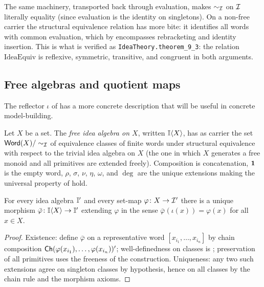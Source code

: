 \begin{remark}
\label{rem:cong-carrier}
The same machinery, transported back through evaluation, makes
$\sim_{\mathcal{I}}$ on $\mathcal{I}$ literally equality (since evaluation is the
identity on singletons). On a non-free carrier the structural
equivalence relation has more bite: it identifies all words with
common evaluation, which by  encompasses
rebracketing and identity insertion. This is what is verified as
\texttt{IdeaTheory.theorem\_9\_3}: the relation $\mathrm{IdeaEquiv}$
is reflexive, symmetric, transitive, and congruent in both arguments.
\end{remark}

\subsection*{Free algebras and quotient maps}

The reflector $\iota$ of  has a more concrete
description that will be useful in concrete model-building.

\begin{construction}\label{cons:free}
Let $X$ be a set. The \emph{free idea algebra on $X$}, written
$\mathbb{I}\langle X\rangle$, has as carrier the set
$\mathsf{Word}(X)/\sim_{\mathcal{I}}$ of equivalence classes of finite words
under structural equivalence with respect to the trivial idea
algebra on $X$ (the one in which $X$ generates a free monoid and all
primitives are extended freely). Composition is concatenation,
$\mathbf{1}$ is the empty word, $\rho$, $\sigma$, $\nu$, $\eta$, $\omega$,
and $\deg$ are the unique extensions making the universal property
of  hold.
\end{construction}

\begin{proposition}
\label{prop:free-ump}
For every idea algebra $\mathbb{I}'$ and every set-map
$\varphi\colon X\to\mathcal{I}'$ there is a unique morphism
$\bar\varphi\colon\mathbb{I}\langle X\rangle\to\mathbb{I}'$ extending
$\varphi$ in the sense $\bar\varphi(\iota(x)) = \varphi(x)$ for all
$x\in X$.
\end{proposition}

\begin{proof}
Existence: define $\bar\varphi$ on a representative word
$[x_{i_1},\dots,x_{i_n}]$ by chain composition $\mathsf{Ch}(\varphi(x_{i_1}),
\dots,\varphi(x_{i_n}))'$; well-definedness on classes is
; preservation of all primitives uses the
freeness of the construction. Uniqueness: any two such extensions
agree on singleton classes by hypothesis, hence on all classes by
the chain rule and the morphism axioms.
\end{proof}

